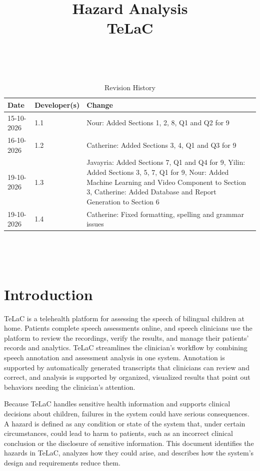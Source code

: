 \documentclass{article}
\title{Hazard Analysis\\ TeLaC}
\author{\authname}
\date{}
\begin{document}
\maketitle
\thispagestyle{empty}

~\newpage


\begin{table}[hp]
\caption{Revision History} \label{TblRevisionHistory}
\begin{tabularx}{\textwidth}{llX}
\toprule
\textbf{Date} & \textbf{Developer(s)} & \textbf{Change}\\
\midrule
15-10-2026 & 1.1 & Nour: Added Sections 1, 2, 8, Q1 and Q2 for 9\\
16-10-2026 & 1.2 & Catherine: Added Sections 3, 4, Q1 and Q3 for 9\\
19-10-2026 & 1.3 & Javayria: Added Sections 7, Q1 and Q4 for 9, Yilin: Added Sections 3, 5, 7, Q1 for 9, Nour: Added Machine Learning and Video Component to Section 3, Catherine: Added Database and Report Generation to Section 6\\
19-10-2026 & 1.4 & Catherine: Fixed formatting, spelling and grammar issues\\
\bottomrule
\end{tabularx}
\end{table}


~\newpage

\tableofcontents

~\newpage



\section{Introduction} \label{sec:Introduction}

TeLaC is a telehealth platform for assessing the speech of bilingual children at home. 
Patients complete speech assessments online, and speech clinicians use the platform to review the recordings, verify the results, and manage their patients’ records and analytics. 
TeLaC streamlines the clinician’s workflow by combining speech annotation and assessment analysis in one system. 
Annotation is supported by automatically generated transcripts that clinicians can review and correct, and analysis is supported by organized, visualized results that point out behaviors needing the clinician’s attention.

Because TeLaC handles sensitive health information and supports clinical decisions about children, failures in the system could have serious consequences. 
A hazard is defined as any condition or state of the system that, under certain circumstances, could lead to harm to patients, such as an incorrect clinical conclusion or the disclosure of sensitive information. 
This document identifies the hazards in TeLaC, analyzes how they could arise, and describes how the system’s design and requirements reduce them.
\end{document}
